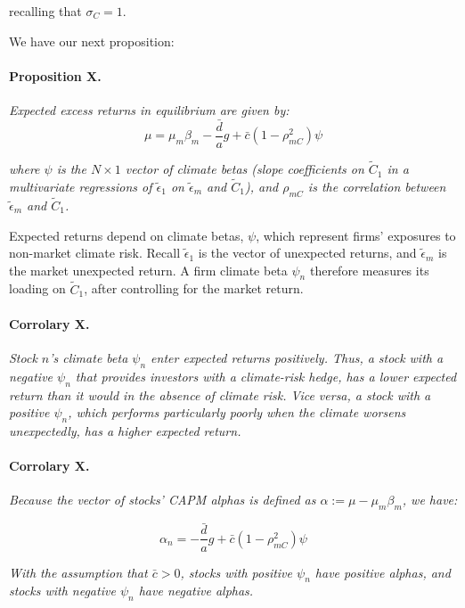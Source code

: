 recalling that $\sigma_C = 1$.

We have our next proposition:

\paragraph{Proposition X.}
\textit{Expected excess returns in equilibrium are given by:}
\begin{equation}
    \mu = \mu_m \beta_m - \frac{\bar{d}}{a}g + \bar{c}(1 - \rho^2_{mC}) \psi
\end{equation}

\textit{where $\psi$ is the $N \times 1$ vector of climate betas 
(slope coefficients on $\tilde{C}_1$ in a multivariate 
regressions of $\tilde{\epsilon}_1$ on $\tilde{\epsilon}_m$ and $\tilde{C}_1$),
and $\rho_{mC}$ is the correlation between $\tilde{\epsilon}_m$ and $\tilde{C}_1$.}


Expected returns depend on climate betas, $\psi$, which represent 
firms' exposures to non-market climate risk. 
Recall $\tilde{\epsilon}_1$ is the vector of unexpected 
returns, and $\tilde{\epsilon}_m$ is the 
market unexpected return.
A firm climate beta $\psi_n$ therefore measures 
its loading on $\tilde{C}_1$, 
after controlling for the market return. 



\paragraph{Corrolary X.}
\textit{Stock $n$'s climate beta $\psi_n$
enter expected returns positively. Thus,
a stock with a negative $\psi_n$ that 
provides investors with a climate-risk hedge,
has a lower expected return than it would in 
the absence of climate risk. Vice versa,
a stock with a positive $\psi_n$, 
which performs particularly poorly 
when the climate worsens unexpectedly, 
has a higher expected return.}


\paragraph{Corrolary X.}
\textit{Because the vector of stocks' CAPM alphas is 
defined as $\alpha := \mu - \mu_m \beta_m$, we have:}

\begin{equation}
    \alpha_n = -\frac{\bar{d}}{a}g + \bar{c}(1 - \rho^2_{mC}) \psi
\end{equation}

\textit{With the assumption that $\bar{c} > 0$, 
stocks with positive $\psi_n$ have positive alphas,
and stocks with negative $\psi_n$ have negative alphas.}

